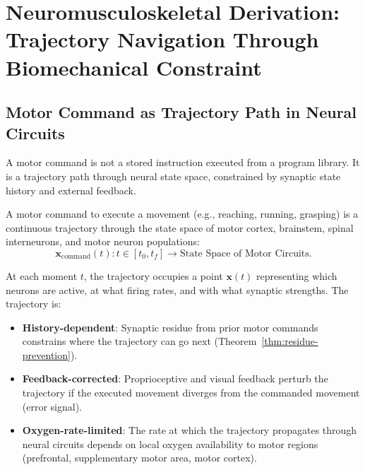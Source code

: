 \section{Neuromusculoskeletal Derivation: Trajectory Navigation Through Biomechanical Constraint}
\label{sec:neuromusculoskeletal}

\subsection{Motor Command as Trajectory Path in Neural Circuits}
\label{subsec:motor-trajectory}

A motor command is not a stored instruction executed from a program library. It is a trajectory path through neural state space, constrained by synaptic state history and external feedback.

\begin{definition}
\label{def:motor-command-trajectory}
A motor command to execute a movement (e.g., reaching, running, grasping) is a continuous trajectory through the state space of motor cortex, brainstem, spinal interneurons, and motor neuron populations:
\begin{equation}
  \mathbf{x}_{\text{command}}(t) : t \in [t_0, t_f] \to \text{State Space of Motor Circuits}.
\end{equation}

At each moment $t$, the trajectory occupies a point $\mathbf{x}(t)$ representing which neurons are active, at what firing rates, and with what synaptic strengths. The trajectory is:
\begin{itemize}[noitemsep]
\item \textbf{History-dependent}: Synaptic residue from prior motor commands constrains where the trajectory can go next (Theorem~\ref{thm:residue-prevention}).
\item \textbf{Feedback-corrected}: Proprioceptive and visual feedback perturb the trajectory if the executed movement diverges from the commanded movement (error signal).
\item \textbf{Oxygen-rate-limited}: The rate at which the trajectory propagates through neural circuits depends on local oxygen availability to motor regions (prefrontal, supplementary motor area, motor cortex).
\end{itemize}
\end{definition}

